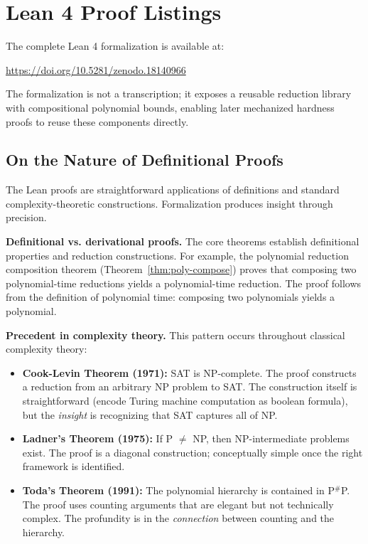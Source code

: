 \section{Lean 4 Proof Listings}\label{app:lean}

The complete Lean 4 formalization is available at:
\begin{center}
\url{https://doi.org/10.5281/zenodo.18140966}
\end{center}

The formalization is not a transcription; it exposes a reusable reduction library with compositional polynomial bounds, enabling later mechanized hardness proofs to reuse these components directly.

\subsection{On the Nature of Definitional Proofs}\label{definitional-proofs-nature}

The Lean proofs are straightforward applications of definitions and standard complexity-theoretic constructions. Formalization produces insight through precision.

\textbf{Definitional vs. derivational proofs.} The core theorems establish definitional properties and reduction constructions. For example, the polynomial reduction composition theorem (Theorem~\ref{thm:poly-compose}) proves that composing two polynomial-time reductions yields a polynomial-time reduction. The proof follows from the definition of polynomial time: composing two polynomials yields a polynomial.

\textbf{Precedent in complexity theory.} This pattern occurs throughout classical complexity theory:

\begin{itemize}
\item \textbf{Cook-Levin Theorem (1971):} SAT is NP-complete. The proof constructs a reduction from an arbitrary NP problem to SAT. The construction itself is straightforward (encode Turing machine computation as boolean formula), but the \emph{insight} is recognizing that SAT captures all of NP.
\item \textbf{Ladner's Theorem (1975):} If P $\neq$ NP, then NP-intermediate problems exist. The proof is a diagonal construction; conceptually simple once the right framework is identified.
\item \textbf{Toda's Theorem (1991):} The polynomial hierarchy is contained in P$^\#$P. The proof uses counting arguments that are elegant but not technically complex. The profundity is in the \emph{connection} between counting and the hierarchy.
\end{itemize}


